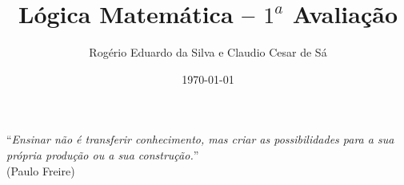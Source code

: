 \documentclass[12pt]{article}
\title{Lógica Matemática -- $1^a$ Avaliação}
\author{Rogério Eduardo da Silva e Claudio Cesar de Sá}
\date{\today}
\begin{document}
\pagestyle{empty}
\maketitle

%


\begin{flushright}
``\textit{Ensinar não é transferir conhecimento, mas criar as possibilidades para a sua própria produção ou a sua construção.}''\\ (Paulo Freire)
\end{flushright}
\end{document}
